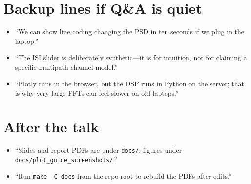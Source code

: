 \documentclass[11pt,a4paper]{article}
\begin{document}
\section*{Backup lines if Q\&A is quiet}

\begin{itemize}
    \item ``We can show line coding changing the PSD in ten seconds if we plug in the laptop.''
    \item ``The ISI slider is deliberately synthetic---it is for intuition, not for claiming a specific multipath channel model.''
    \item ``Plotly runs in the browser, but the DSP runs in Python on the server; that is why very large FFTs can feel slower on old laptops.''
\end{itemize}

\section*{After the talk}

\begin{itemize}
    \item ``Slides and report PDFs are under \texttt{docs/}; figures under \texttt{docs/plot\_guide\_screenshots/}.''
    \item ``Run \texttt{make -C docs} from the repo root to rebuild the PDFs after edits.''
\end{itemize}
\end{document}
